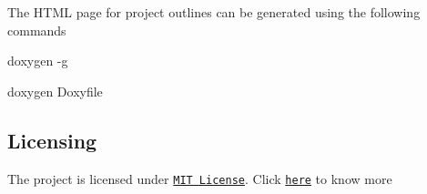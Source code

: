 \begin{DoxyItemize}
The H\+T\+ML page for project outlines can be generated using the following commands
\begin{DoxyEnumerate}
\item doxygen -\/g
\item doxygen Doxyfile
\end{DoxyEnumerate}
\end{DoxyItemize}

\subsection*{Licensing}

The project is licensed under \href{https://opensource.org/licenses/MIT}{\tt M\+IT License}. Click \href{https://github.com/kavyadevd/beginner_tutorials/blob/main/LICENSE}{\tt here} to know more 
